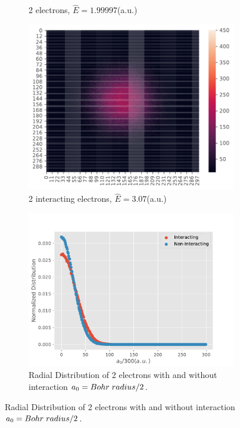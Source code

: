 \documentclass[11pt,a4paper,titlepage]{article}
\begin{document}
\begin{figure}[H]
\begin{subfigure}[t]{.5\textwidth}
\caption{2 electrons, $\hat E = 1.99997$(a.u.)}
\label{imp2}
\end{subfigure}
\begin{subfigure}[b]{.5\textwidth}
\centering
\includegraphics[trim=0cm 0.0cm 0cm 0.0cm,scale = 0.6]{D2_P_2I_Y_Importance_S_2pow20_eqS_2pow20_Position_Sampling_InteractingE3_07}
\caption{2 interacting electrons, $\hat E = 3.07$(a.u.)}
\label{imp3}
\end{subfigure}
\begin{subfigure}[b]{.5\textwidth}
\centering
\includegraphics[trim=0cm 0.0cm 0cm 0.0cm,scale = 0.5]{Radial_distribution_interacting_v_Non.pdf}
\caption{Radial Distribution of 2 electrons with and without interaction $a_0 =  Bohr\hspace{1mm}radius/2$.}

\end{subfigure}
\end{figure}
\end{document}

